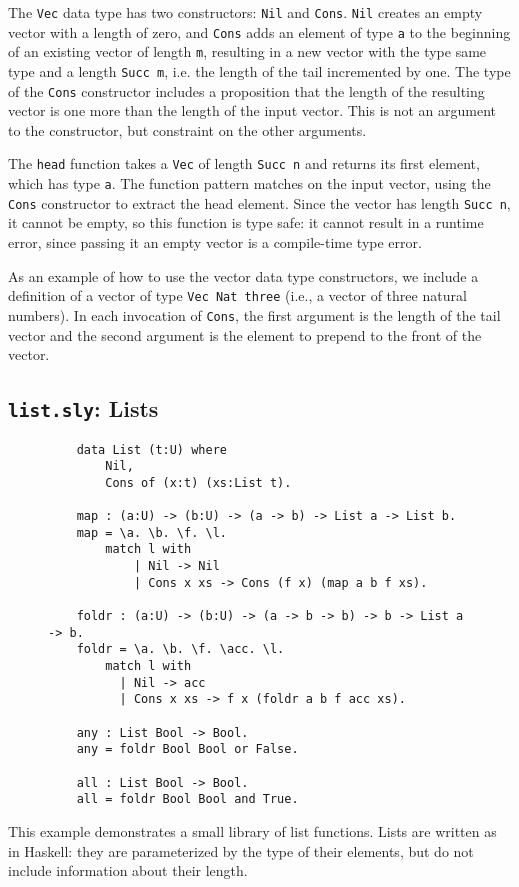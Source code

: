 The \texttt{Vec} data type has two constructors: \texttt{Nil} and \texttt{Cons}. 
\texttt{Nil} creates an empty vector with a length of zero, and \texttt{Cons}
adds an element of type \texttt{a} to the beginning of an existing vector of
length \texttt{m}, resulting in a new vector with the type same type and a
length \texttt{Succ m}, i.e. the length of the tail incremented by one. 
The type of the \texttt{Cons} constructor includes a proposition that the length of
the resulting vector is one more than the length of the input vector. This is
not an argument to the constructor, but constraint on the other arguments.

The \texttt{head} function takes a \texttt{Vec} of length \texttt{Succ n} and
returns its first element, which has type \texttt{a}. 
The function pattern matches on the input vector, using the \texttt{Cons} constructor to extract the head element.
Since the vector has length \texttt{Succ n}, it cannot be empty, so this
function is type safe: it cannot result in a runtime error, since passing it an
empty vector is a compile-time type error.

As an example of how to use the vector data type constructors, we include a
definition of a vector of type \texttt{Vec Nat three} (i.e., a vector of
three natural numbers). In each invocation of \texttt{Cons}, the first argument
is the length of the tail vector and the second argument is the element to
prepend to the front of the vector.

\subsection{\texttt{list.sly}: Lists}
\begin{figure}[h!]
\begin{lstlisting}
    data List (t:U) where
        Nil,
        Cons of (x:t) (xs:List t).

    map : (a:U) -> (b:U) -> (a -> b) -> List a -> List b.
    map = \a. \b. \f. \l.
        match l with
            | Nil -> Nil
            | Cons x xs -> Cons (f x) (map a b f xs).

    foldr : (a:U) -> (b:U) -> (a -> b -> b) -> b -> List a -> b.
    foldr = \a. \b. \f. \acc. \l.
        match l with
          | Nil -> acc
          | Cons x xs -> f x (foldr a b f acc xs).

    any : List Bool -> Bool.
    any = foldr Bool Bool or False.

    all : List Bool -> Bool.
    all = foldr Bool Bool and True.
\end{lstlisting}
\end{figure}
This example demonstrates a small library of list functions. Lists are written
as in Haskell: they are parameterized by the type of their elements, but do not
include information about their length.

